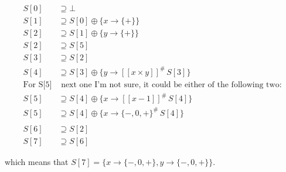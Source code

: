 \documentclass{article}
\begin{document}
	\begin{align*}
	S[0] &\supseteq \bot\\
	S[1] &\supseteq S[0] \oplus \{x \to \{+\}\}\\
	S[2] &\supseteq S[1] \oplus \{y \to \{+\}\}\\
	S[2] &\supseteq S[5]\\
	S[3] &\supseteq S[2]\\
	S[4] &\supseteq S[3] \oplus \{y\to[[x\times y]]^\# \, S[3]\}\\
	\textrm{For S[5]}& \textrm{ next one I'm not sure, it could be either of the following two:}\\
	S[5] &\supseteq S[4] \oplus \{x\to[[x-1]]^\# \, S[4]\}\\
	S[5] &\supseteq S[4] \oplus \{x\to\{-,0,+\}^\# \, S[4]\}\\\\
	S[6] &\supseteq S[2]\\
	S[7] &\supseteq S[6]
	\end{align*}
	\par which means that $S[7] = \{x \to \{-,0,+\}, y \to \{-,0,+\} \}$. 
	
\end{document}
